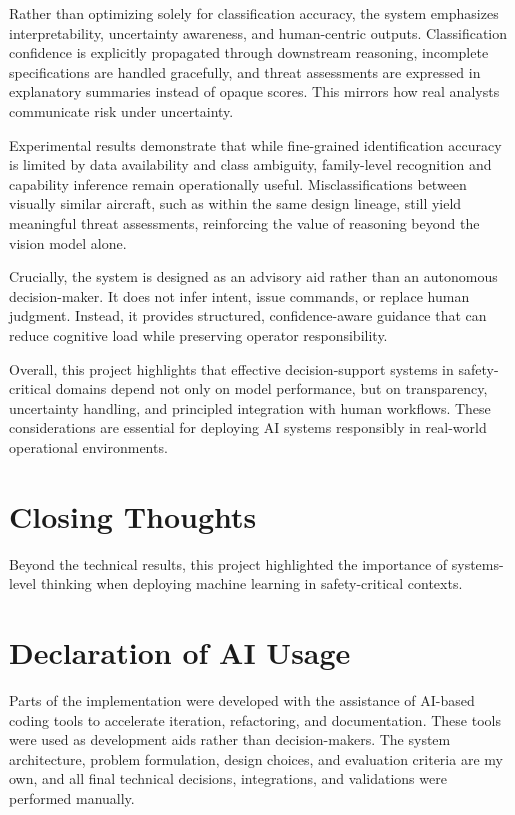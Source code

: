 \documentclass[11pt]{article}
\begin{document}
Rather than optimizing solely for classification accuracy, the system emphasizes interpretability, uncertainty awareness, and human-centric outputs. Classification confidence is explicitly propagated through downstream reasoning, incomplete specifications are handled gracefully, and threat assessments are expressed in explanatory summaries instead of opaque scores. This mirrors how real analysts communicate risk under uncertainty.

Experimental results demonstrate that while fine-grained identification accuracy is limited by data availability and class ambiguity, family-level recognition and capability inference remain operationally useful. Misclassifications between visually similar aircraft, such as within the same design lineage, still yield meaningful threat assessments, reinforcing the value of reasoning beyond the vision model alone.

Crucially, the system is designed as an advisory aid rather than an autonomous decision-maker. It does not infer intent, issue commands, or replace human judgment. Instead, it provides structured, confidence-aware guidance that can reduce cognitive load while preserving operator responsibility.

Overall, this project highlights that effective decision-support systems in safety-critical domains depend not only on model performance, but on transparency, uncertainty handling, and principled integration with human workflows. These considerations are essential for deploying AI systems responsibly in real-world operational environments.


\section*{Closing Thoughts}

Beyond the technical results, this project highlighted the importance of systems-level thinking when deploying machine learning in safety-critical contexts.

\section*{Declaration of AI Usage}
Parts of the implementation were developed with the assistance of AI-based coding tools to accelerate iteration, refactoring, and documentation. These tools were used as development aids rather than decision-makers. The system architecture, problem formulation, design choices, and evaluation criteria are my own, and all final technical decisions, integrations, and validations were performed manually.
\end{document}
